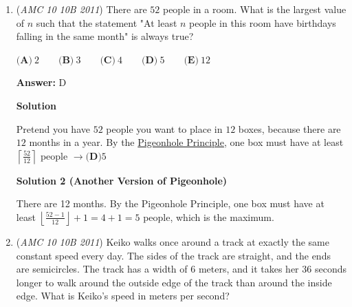 \begin{enumerate}
\textbf{Solution 2}

The problem asks for the value of 
 \[\dfrac{10^{10}}{10^9 + 10^8 + \ldots + 10 + 1}.\] Written in base 10, we can find the value of $10^9 + 10^8 + \ldots + 10 + 1$ to be $1111111111.$ Long division gives us the answer to be $\boxed{\mathrm{(B) \ } 9}.$

 Alternate finish: multiply the denominator by 9 and notice that it is 1 less than $10^{10}$. So the answer is very very close to $\boxed{\mathrm{(B) } 9}$.

 



\textbf{Solution 3}

Let $f(n)=\dfrac{10^n}{1+10+10^2+10^3+\cdots+10^{n-1}}$. We are approximating $f(10)$. Trying several small values of $n$ gives answers very close to $9$, so our answer is $\boxed{\textbf{(B)}~9}$. Note that $f(1)=10$, but $f(2)=\dfrac{100}{11}\approx9.09.$ ~Technodoggo

 


	\item (\textit{AMC 10 10B 2011}) There are $52$ people in a room.  What is the largest value of $n$ such that the statement "At least $n$ people in this room have birthdays falling in the same month" is always true?


 $\textbf{(A)}\ 2 \qquad\textbf{(B)}\ 3 \qquad\textbf{(C)}\ 4 \qquad\textbf{(D)}\ 5 \qquad\textbf{(E)}\ 12$

 \textbf{Answer: }D



\textbf{Solution}

Pretend you have $52$ people you want to place  in $12$ boxes, because there are $12$ months in a year. By the \href{https://artofproblemsolving.com/wiki/index.php?title=Pigeonhole\_Principle}{Pigeonhole Principle}, one box must have at least $\left\lceil \frac{52}{12} \right\rceil$ people $\longrightarrow \boxed{\textbf{(D)} 5}$




\textbf{Solution 2 (Another Version of Pigeonhole)}

There are 12 months. By the Pigeonhole Principle, one box must have at least $\left \lfloor \frac{52-1}{12} \right \rfloor + 1 = 4 + 1 = \boxed{5}$ people, which is the maximum.

 


	\item (\textit{AMC 10 10B 2011}) Keiko walks once around a track at exactly the same constant speed every day. The sides of the track are straight, and the ends are semicircles. The track has a width of $6$ meters, and it takes her $36$ seconds longer to walk around the outside edge of the track than around the inside edge. What is Keiko's speed in meters per second?



\end{enumerate}
